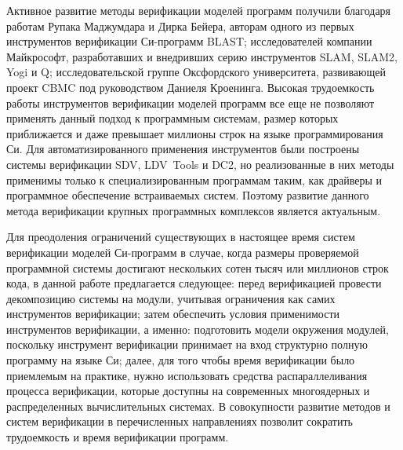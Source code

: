 \documentclass[%
autoref,
colorlinks,  
facsimile,   %
]{disser}
\begin{document}
{Активное развитие методы верификации моделей программ получили благодаря работам Рупака Маджумдара и Дирка Бейера, авторам одного из первых инструментов верификации Си-программ BLAST; исследователей компании Майкрософт, разработавших и внедривших серию инструментов SLAM, SLAM2, Yogi и Q; исследовательской группе Оксфордского университета, развивающей проект CBMC под руководством Даниеля Кроенинга.
Высокая трудоемкость работы инструментов верификации моделей программ все еще не позволяют применять данный подход к программным системам, размер которых приближается и даже превышает миллионы строк на языке программирования Си.
Для автоматизированного применения инструментов были построены системы верификации SDV, LDV~Tools и DC2, но реализованные в них методы применимы только к специализированным программам таким, как драйверы и программное обеспечение встраиваемых систем.
Поэтому развитие данного метода верификации крупных программных комплексов является актуальным.

Для преодоления ограничений существующих в настоящее время систем верификации моделей Си-программ в случае, когда размеры проверяемой программной системы достигают нескольких сотен тысяч или миллионов строк кода, в данной работе предлагается следующее: перед верификацией провести декомпозицию системы на модули, учитывая ограничения как самих инструментов верификации; затем обеспечить условия применимости инструментов верификации, а именно: подготовить модели окружения модулей, поскольку инструмент верификации принимает на вход структурно полную программу на языке Си; далее, для того чтобы время верификации было приемлемым на практике, нужно использовать средства распараллеливания процесса верификации, которые доступны на современных многоядерных и распределенных вычислительных системах. 
В совокупности развитие методов и систем верификации в перечисленных направлениях позволит сократить трудоемкость и время верификации программ.
}

\end{document}
